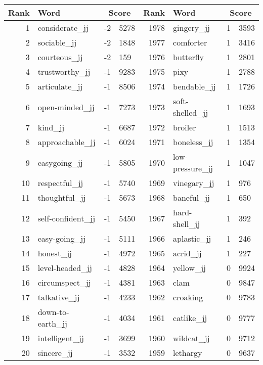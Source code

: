 \begin{table}[tbp]
    \begin{tabular}{| rlr@{.}l | rlr@{.}l |}
    \hline
    \textbf{Rank} & \textbf{Word} & \multicolumn{2}{c|}{\textbf{Score}} & \textbf{Rank} & \textbf{Word} & \multicolumn{2}{c|}{\textbf{Score}} \\
    \hline
    1 & considerate\_jj & -2 & 5278    &    1978 & gingery\_jj & 1 & 3593 \\
    2 & sociable\_jj & -2 & 1848    &    1977 & comforter & 1 & 3416 \\
    3 & courteous\_jj & -2 & 159    &    1976 & butterfly & 1 & 2801 \\
    4 & trustworthy\_jj & -1 & 9283    &    1975 & pixy & 1 & 2788 \\
    5 & articulate\_jj & -1 & 8506    &    1974 & bendable\_jj & 1 & 1726 \\
    6 & open-minded\_jj & -1 & 7273    &    1973 & soft-shelled\_jj & 1 & 1693 \\
    7 & kind\_jj & -1 & 6687    &    1972 & broiler & 1 & 1513 \\
    8 & approachable\_jj & -1 & 6024    &    1971 & boneless\_jj & 1 & 1354 \\
    9 & easygoing\_jj & -1 & 5805    &    1970 & low-pressure\_jj & 1 & 1047 \\
    10 & respectful\_jj & -1 & 5740    &    1969 & vinegary\_jj & 1 & 976 \\
    11 & thoughtful\_jj & -1 & 5673    &    1968 & baneful\_jj & 1 & 650 \\
    12 & self-confident\_jj & -1 & 5450    &    1967 & hard-shell\_jj & 1 & 392 \\
    13 & easy-going\_jj & -1 & 5111    &    1966 & aplastic\_jj & 1 & 246 \\
    14 & honest\_jj & -1 & 4972    &    1965 & acrid\_jj & 1 & 227 \\
    15 & level-headed\_jj & -1 & 4828    &    1964 & yellow\_jj & 0 & 9924 \\
    16 & circumspect\_jj & -1 & 4381    &    1963 & clam & 0 & 9847 \\
    17 & talkative\_jj & -1 & 4233    &    1962 & croaking & 0 & 9783 \\
    18 & down-to-earth\_jj & -1 & 4034    &    1961 & catlike\_jj & 0 & 9777 \\
    19 & intelligent\_jj & -1 & 3699    &    1960 & wildcat\_jj & 0 & 9712 \\
    20 & sincere\_jj & -1 & 3532    &    1959 & lethargy & 0 & 9637 \\

\end{tabular}
\end{table}

